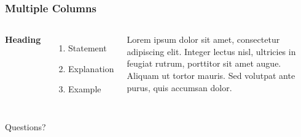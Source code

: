 \documentclass{beamer}
\begin{document}

\begin{frame}
\frametitle{Multiple Columns}
\begin{columns}[c] %

\textbf{Heading}
\begin{enumerate}
\item Statement
\item Explanation
\item Example
\end{enumerate}

Lorem ipsum dolor sit amet, consectetur adipiscing elit. Integer lectus nisl, ultricies in feugiat rutrum, porttitor sit amet augue. Aliquam ut tortor mauris. Sed volutpat ante purus, quis accumsan dolor.

\end{columns}
\end{frame}

\begin{frame}
\Huge{\centerline{Questions?}}
\end{frame}
\end{document}
